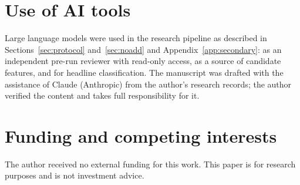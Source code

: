 \section*{Use of AI tools}

Large language models were used in the research pipeline as described in Sections~\ref{sec:protocol} and~\ref{sec:noadd} and Appendix~\ref{app:secondary}: as an independent pre-run reviewer with read-only access, as a source of candidate features, and for headline classification. The manuscript was drafted with the assistance of Claude (Anthropic) from the author's research records; the author verified the content and takes full responsibility for it.

\section*{Funding and competing interests}

The author received no external funding for this work. This paper is for research purposes and is not investment advice.
